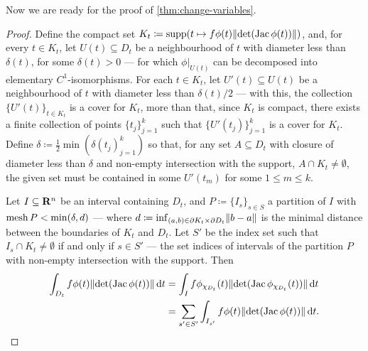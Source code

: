 Now we are ready for the proof of \cref{thm:change-variables}.

\begin{proof}
    Define the compact set \(K_t \coloneq \operatorname{supp}(t \mapsto f \phi(t) \lVert\det(\operatorname{Jac}
            \phi(t))\rVert)\), and, for every \(t \in K_t\), let \(U(t) \subseteq D_t\) be a
    neighbourhood of \(t\) with diameter less than \(\delta(t)\), for some
    \(\delta(t) > 0\) --- for which \(\phi|_{U(t)}\) can be decomposed into
    elementary \(C^1\)-isomorphisms. For each \(t \in K_t\), let \(U'(t) \subseteq
    U(t)\) be a neighbourhood of \(t\) with diameter less than \(\delta(t)/2\) ---
    with this, the collection \(\{U'(t)\}_{t \in K_t}\) is a cover for \(K_t\), more
    than that, since \(K_t\) is compact, there exists a finite collection of points
    \(\{t_{j}\}_{j=1}^k\) such that \(\{U'(t_j)\}_{j=1}^k\) is a cover for
    \(K_t\). Define \(\delta \coloneq \frac 1 2 \min(\delta(t_j)_{j=1}^k)\) so that,
    for any set \(A \subseteq D_t\) with closure of diameter less than \(\delta\)
    and non-empty intersection with the support, \(A \cap K_t \neq \emptyset\), the
    given set must be contained in some \(U'(t_m)\) for some \(1 \leq m \leq k\).

    Let \(I \subseteq \mathbf{R}^n\) be an interval containing \(D_t\), and \(P \coloneq
    \{I_{s}\}_{s \in S}\) a partition of \(I\) with \(\operatorname{mesh} P < \min(\delta, d)\)
    --- where \(d \coloneq \inf_{(a, b) \in \partial K_t \times \partial D_t}
    \lVert b - a\rVert\) is the minimal distance between the boundaries of \(K_t\) and
    \(D_{t}\). Let \(S'\) be the index set such that \(I_s \cap K_t \neq \emptyset\)
    if and only if \(s \in S'\) --- the set indices of intervals of the partition
    \(P\) with non-empty intersection with the support. Then
    \begin{align*}
        \int_{D_t} f\phi(t) \lVert\det(\operatorname{Jac} \phi(t))\rVert\, \mathrm{d} t
         & = \int_I f \phi_{\chi_{D_t}}(t)
        \lVert\det(\operatorname{Jac} \phi_{\chi_{D_t}}(t))\rVert\, \mathrm{d} t                                   \\
         & = \sum_{s' \in S'} \int_{I_{s'}} f \phi(t) \lVert\det(\operatorname{Jac} \phi(t))\rVert\, \mathrm{d} t.
    \end{align*}


\end{proof}
